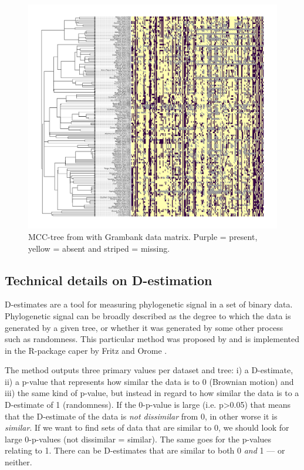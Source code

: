 \documentclass[12pt,letterpaper]{article}
\begin{document}
\begin{figure}[!ht]
\centering
\includegraphics[width=18cm]{illustrations/plots_from_R/coverage_plots/tree_heatmap_gray_mcct.png}
\caption{MCC-tree from \citet{grayetal_2009} with Grambank data matrix. Purple = present, yellow = absent and striped = missing.}
\label{fig:tree_heatmap}
\end{figure}


\FloatBarrier
\newpage
\subsection{Technical details on D-estimation}
\label{supp:d_estimate}
D-estimates are a tool for measuring phylogenetic signal in a set of binary data. Phylogenetic signal can be broadly described as the degree to which the data is generated by a given tree, or whether it was generated by some other process such as randomness. This particular method was proposed by \cite{fritz2010selectivity} and is implemented in the R-package caper by Fritz and Orome \citep{orme2013caper}. 

The method outputs three primary values per dataset and tree: i) a D-estimate, ii) a p-value that represents how similar the data is to 0 (Brownian motion) and iii) the same kind of p-value, but instead in regard to how similar the data is to a D-estimate of 1 (randomness). If the 0-p-value is large (i.e. p>0.05) that means that the D-estimate of the data is \emph{not dissimilar} from 0, in other worse it is \emph{similar}. If we want to find sets of data that are similar to 0, we should look for large 0-p-values (not dissimilar = similar). The same goes for the p-values relating to 1. There can be D-estimates that are similar to both 0 \emph{and} 1 --- or neither.
\end{document}

